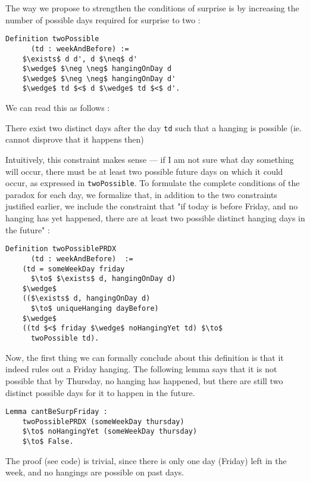 \documentclass[journal]{journal}
\newenvironment{myindent}{\begin{adjustwidth}{1cm}{}}{\end{adjustwidth}}
\begin{document}
The way we propose to strengthen the conditions of surprise is by increasing
the number of possible days required for surprise to two :

\begin{lstlisting}[mathescape=true]
  Definition twoPossible
      (td : weekAndBefore) :=
    $\exists$ d d', d $\neq$ d'
    $\wedge$ $\neg \neg$ hangingOnDay d
    $\wedge$ $\neg \neg$ hangingOnDay d'
    $\wedge$ td $<$ d $\wedge$ td $<$ d'.
\end{lstlisting}

We can read this as follows :

\begin{myindent}
  There exist two distinct days after the day {\tt td} such that
  a hanging is possible (ie. cannot disprove that it happens then)
\end{myindent}

Intuitively, this constraint makes sense --- if I am not sure what day something
will occur, there must be at least two possible future days on which it could occur,
as expressed in {\tt twoPossible}.
To formulate the complete conditions of the paradox for each day, we formalize that, in addition
to the two constraints justified earlier, we include the constraint that
"if today is before Friday, and no hanging has yet happened, there are at least
two possible distinct hanging days in the future" :

\begin{lstlisting}[mathescape=true]
  Definition twoPossiblePRDX
      (td : weekAndBefore)  :=
    (td = someWeekDay friday
      $\to$ $\exists$ d, hangingOnDay d)
    $\wedge$
    (($\exists$ d, hangingOnDay d)
      $\to$ uniqueHanging dayBefore)
    $\wedge$
    ((td $<$ friday $\wedge$ noHangingYet td) $\to$
      twoPossible td).
\end{lstlisting}

Now, the first thing we can formally conclude about this definition is that it indeed rules out
a Friday hanging. The following lemma says that it is not possible that by Thursday,
no hanging has happened, but there are still two distinct possible days for it to
happen in the future.

\begin{lstlisting}[mathescape=true]
  Lemma cantBeSurpFriday :
    twoPossiblePRDX (someWeekDay thursday)
    $\to$ noHangingYet (someWeekDay thursday)
    $\to$ False.
\end{lstlisting}

The proof (see code) is trivial, since there is only one day (Friday) left in the week,
and no hangings are possible on past days.
\end{document}
